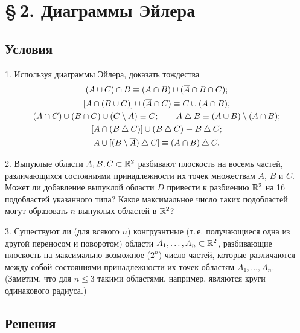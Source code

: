 \section*{\S\,2. Диаграммы Эйлера}
\subsection*{Условия}
1. Используя диаграммы Эйлера, доказать тождества
\[
\begin{gathered}
(A\cup C)\cap B\equiv(A\cap B)\cup(\ov A\cap B\cap C);\\
[A\cap(B\cup C)]\cup(\ov A\cap C)\equiv C\cup(A\cap B);\\
(A\cap C)\cup(B\cap C)\cup(C\setminus A)\equiv C;\qquad A\sd B\equiv(A\cup B)\setminus(A\cap B);\\
[A\cap(B\sd C)]\cup(B\sd C)\equiv B\sd C;\\
A\cup[(B\setminus\ov A)\sd C]\equiv(A\cap B)\sd C.
\end{gathered}
\]


2. Выпуклые области $A,B,C\subset\mathbb R^2$ разбивают плоскость на восемь частей,
различающихся состояниями принадлежности их точек множествам $A$, $B$ и $C$.
Может ли добавление выпуклой области $D$ привести к разбиению $\mathbb R^2$ на 16
подобластей указанного типа? Какое максимальное число таких подобластей
могут образовать $n$ выпуклых областей в $\mathbb R^2$?

3. Существуют ли (для всякого $n$) конгруэнтные (т.\,е. получающиеся одна из
другой переносом и поворотом) области $A_1,\dots,A_n\subset\mathbb R^2$,
разбивающие плоскость на максимально возможное ($2^n$) число частей, которые
различаются между собой состояниями принадлежности их точек областям
$A_1,\dots,A_n$. (Заметим, что для $n\le3$ такими областями, например,
являются круги одинакового радиуса.)

\subsection*{Решения}

